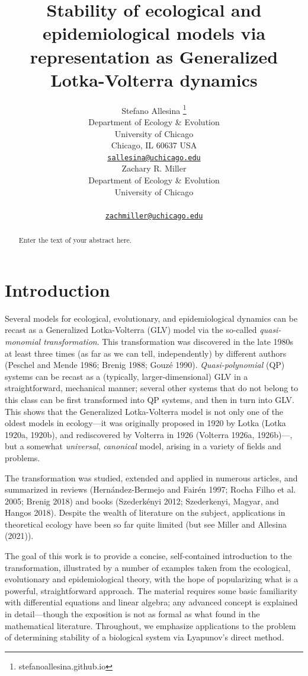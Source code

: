 \documentclass{article}
\title{Stability of ecological and epidemiological models via
representation as Generalized Lotka-Volterra dynamics}
\author{
    Stefano Allesina
    \thanks{stefanoallesina.github.io}
   \\
    Department of Ecology \& Evolution \\
    University of Chicago \\
  Chicago, IL 60637 USA \\
  \texttt{\href{mailto:sallesina@uchicago.edu}{\nolinkurl{sallesina@uchicago.edu}}} \\
   \And
    Zachary R. Miller
   \\
    Department of Ecology \& Evolution \\
    University of Chicago \\
   \\
  \texttt{\href{mailto:zachmiller@uchicago.edu}{\nolinkurl{zachmiller@uchicago.edu}}} \\
  }
\begin{document}
\maketitle

\def\tightlist{}


\begin{abstract}
Enter the text of your abstract here.
\end{abstract}


\hypertarget{introduction}{%
\section{Introduction}\label{introduction}}

Several models for ecological, evolutionary, and epidemiological
dynamics can be recast as a Generalized Lotka-Volterra (GLV) model via
the so-called \emph{quasi-monomial transformation}. This transformation
was discovered in the late 1980s at least three times (as far as we can
tell, independently) by different authors (Peschel and Mende 1986;
Brenig 1988; Gouzé 1990). \emph{Quasi-polynomial} (QP) systems can be
recast as a (typically, larger-dimensional) GLV in a straightforward,
mechanical manner; several other systems that do not belong to this
class can be first transformed into QP systems, and then in turn into
GLV. This shows that the Generalized Lotka-Volterra model is not only
one of the oldest models in ecology---it was originally proposed in 1920
by Lotka (Lotka 1920a, 1920b), and rediscovered by Volterra in 1926
(Volterra 1926a, 1926b)---, but a somewhat \emph{universal},
\emph{canonical} model, arising in a variety of fields and problems.

The transformation was studied, extended and applied in numerous
articles, and summarized in reviews (Hernández-Bermejo and Fairén 1997;
Rocha Filho et al. 2005; Brenig 2018) and books (Szederkényi 2012;
Szederkenyi, Magyar, and Hangos 2018). Despite the wealth of literature
on the subject, applications in theoretical ecology have been so far
quite limited (but see Miller and Allesina (2021)).

The goal of this work is to provide a concise, self-contained
introduction to the transformation, illustrated by a number of examples
taken from the ecological, evolutionary and epidemiological theory, with
the hope of popularizing what is a powerful, straightforward approach.
The material requires some basic familiarity with differential equations
and linear algebra; any advanced concept is explained in detail---though
the exposition is not as formal as what found in the mathematical
literature. Throughout, we emphasize applications to the problem of
determining stability of a biological system via Lyapunov's direct
method.
\end{document}
